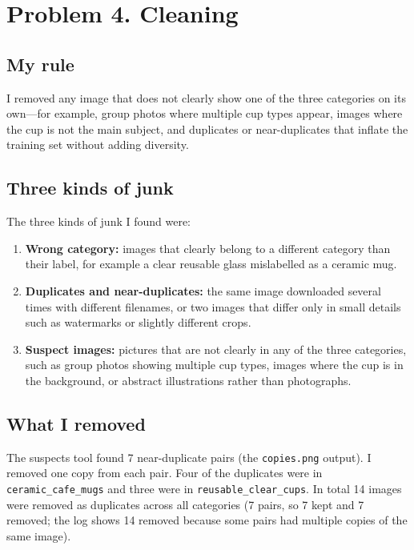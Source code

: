 \documentclass[11pt]{article}
\begin{document}
\section*{Problem 4. Cleaning}

\subsection*{My rule}
I removed any image that does not clearly show one of the three categories on its own---for example, group photos where multiple cup types appear, images where the cup is not the main subject, and duplicates or near-duplicates that inflate the training set without adding diversity.

\subsection*{Three kinds of junk}
The three kinds of junk I found were:

\begin{enumerate}

\item \textbf{Wrong category:} images that clearly belong to a different category than their label, for example a clear reusable glass mislabelled as a ceramic mug.

\item \textbf{Duplicates and near-duplicates:} the same image downloaded several times with different filenames, or two images that differ only in small details such as watermarks or slightly different crops.

\item \textbf{Suspect images:} pictures that are not clearly in any of the three categories, such as group photos showing multiple cup types, images where the cup is in the background, or abstract illustrations rather than photographs.

\end{enumerate}


\subsection*{What I removed}

The suspects tool found 7 near-duplicate pairs (the \texttt{copies.png} output). I removed one copy from each pair. Four of the duplicates were in \texttt{ceramic\_cafe\_mugs} and three were in \texttt{reusable\_clear\_cups}. In total 14 images were removed as duplicates across all categories (7 pairs, so 7 kept and 7 removed; the log shows 14 removed because some pairs had multiple copies of the same image).
\end{document}

